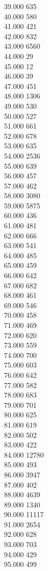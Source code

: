 { 39.000	635 \\
 40.000	580 \\
 41.000	421 \\
 42.000	832 \\
 43.000	6560 \\
 44.000	29 \\
 45.000	12 \\
 46.000	39 \\
 47.000	451 \\
 48.000	1306 \\
 49.000	530 \\
 50.000	527 \\
 51.000	661 \\
 52.000	678 \\
 53.000	635 \\
 54.000	2536 \\
 55.000	639 \\
 56.000	457 \\
 57.000	462 \\
 58.000	3080 \\
 59.000	5875 \\
 60.000	436 \\
 61.000	481 \\
 62.000	666 \\
 63.000	541 \\
 64.000	485 \\
 65.000	459 \\
 66.000	642 \\
 67.000	682 \\
 68.000	461 \\
 69.000	546 \\
 70.000	458 \\
 71.000	469 \\
 72.000	620 \\
 73.000	559 \\
 74.000	700 \\
 75.000	603 \\
 76.000	642 \\
 77.000	582 \\
 78.000	683 \\
 79.000	701 \\
 80.000	625 \\
 81.000	619 \\
 82.000	502 \\
 83.000	422 \\
 84.000	12780 \\
 85.000	493 \\
 86.000	3947 \\
 87.000	402 \\
 88.000	4639 \\
 89.000	1340 \\
 90.000	11117 \\
 91.000	2654 \\
 92.000	628 \\
 93.000	703 \\
 94.000	429 \\
 95.000	499 \\
}
